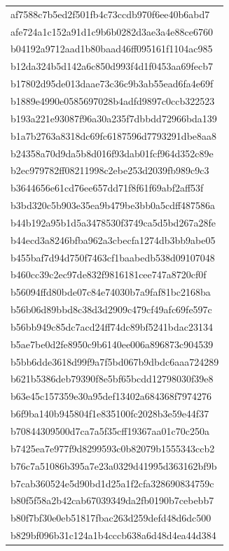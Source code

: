 \begin{tabular}{l}
af7588c7b5ed2f501fb4c73ccdb970f6ee40b6abd7 \\
afe724a1c152a91d1c9b6b0282d3ae3a4e88ce6760 \\
b04192a9712aad1b80baad46ff095161f1104ac985 \\
b12da324b5d142a6c850d993f4d1f0453aa69fecb7 \\
b17802d95de013daae73c36c9b3ab55ead6fa4e69f \\
b1889e4990e0585697028b4adfd9897c0ccb322523 \\
b193a221e93087f96a30a235f7dbbdd72966bda139 \\
b1a7b2763a8318dc69fc6187596d7793291dbe8aa8 \\
b24358a70d9da5b8d016f93dab01fcf964d352c89e \\
b2ec979782ff08211998c2ebe253d2039fb989c9c3 \\
b3644656e61cd76ee657dd71f8f61f69abf2aff53f \\
b3bd320c5b903e35ea9b479be3bb0a5cdff487586a \\
b44b192a95b1d5a3478530f3749ca5d5bd267a28fe \\
b44ecd3a8246bfba962a3cbecfa1274db3bb9abe05 \\
b455baf7d94d750f7463cf1baabedb538d09107048 \\
b460cc39c2ec97de832f9816181cee747a8720cf0f \\
b56094ffd80bde07c84e74030b7a9faf81bc2168ba \\
b56b06d89bbd8c38d3d2909c479cf49afc69fe597c \\
b56bb949c85dc7acd24ff74dc89bf5241bdac23134 \\
b5ae7be0d2fe8950c9b6140ee006a896873c904539 \\
b5bb6dde3618d99f9a7f5bd067b9dbdc6aaa724289 \\
b621b5386deb79390f8e5bf65bcdd12798030f39e8 \\
b63e45c157359e30a95def13402a684368f7974276 \\
b6f9ba140b945804f1e835100fc2028b3e59e44f37 \\
b70844309500d7ca7a5f35cff19367aa01c70c250a \\
b7425ea7e977f9d8299593c0b82079b1555343ccb2 \\
b76c7a51086b395a7e23a0329d41995d363162bf9b \\
b7cab360524e5d90bd1d25a1f2cfa328690834759c \\
b80f5f58a2b42cab67039349da2fb0190b7cebebb7 \\
b80f7bf30e0eb51817fbac263d259defd48d6dc500 \\
b829bf096b31c124a1b4cccb638a6d48d4ea44d384 \\

\end{tabular}
